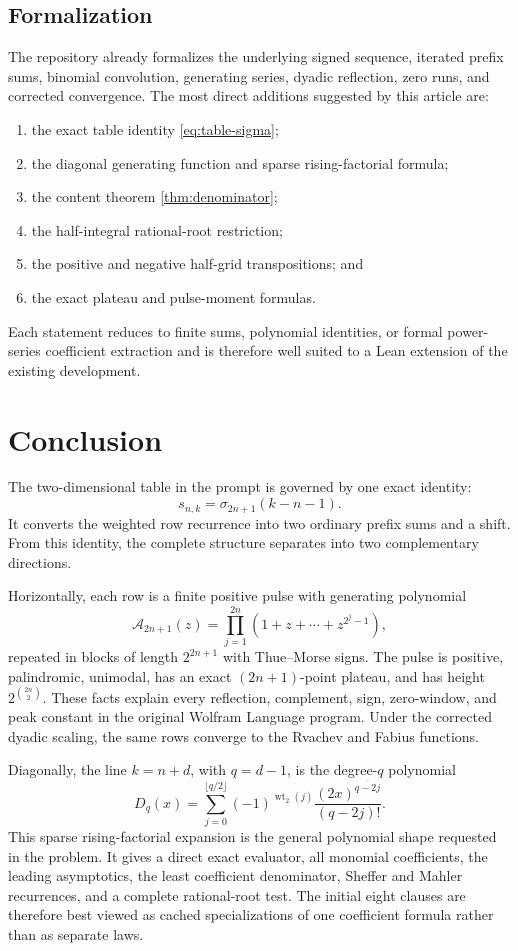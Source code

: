\documentclass[11pt]{article}
\theoremstyle{definition}
\theoremstyle{remark}
\newcommand{\A}{\mathcal A}
\newcommand{\Diag}{D}
\newcommand{\rising}[2]{#1^{\overline{#2}}}
\newcommand{\wt}{\operatorname{wt}_2}
\begin{document}
\subsection{Formalization}

The repository already formalizes the underlying signed sequence, iterated
prefix sums, binomial convolution, generating series, dyadic reflection,
zero runs, and corrected convergence.  The most direct additions suggested
by this article are:
\begin{enumerate}[leftmargin=2.2em]
\item the exact table identity \cref{eq:table-sigma};
\item the diagonal generating function and sparse rising-factorial formula;
\item the content theorem \cref{thm:denominator};
\item the half-integral rational-root restriction;
\item the positive and negative half-grid transpositions; and
\item the exact plateau and pulse-moment formulas.
\end{enumerate}
Each statement reduces to finite sums, polynomial identities, or formal
power-series coefficient extraction and is therefore well suited to a Lean
extension of the existing development.

\section{Conclusion}

The two-dimensional table in the prompt is governed by one exact identity:
\[
 s_{n,k}=\sigma_{2n+1}(k-n-1).
\]
It converts the weighted row recurrence into two ordinary prefix sums and a
shift.  From this identity, the complete structure separates into two
complementary directions.

Horizontally, each row is a finite positive pulse with generating polynomial
\[
 \A_{2n+1}(z)=
 \prod_{j=1}^{2n}(1+z+\cdots+z^{2^j-1}),
\]
repeated in blocks of length \(2^{2n+1}\) with Thue--Morse signs.  The pulse
is positive, palindromic, unimodal, has an exact \((2n+1)\)-point plateau,
and has height \(2^{\binom{2n}{2}}\).  These facts explain every reflection,
complement, sign, zero-window, and peak constant in the original Wolfram
Language program.  Under the corrected dyadic scaling, the same rows
converge to the Rvachev and Fabius functions.

Diagonally, the line \(k=n+d\), with \(q=d-1\), is the degree-\(q\)
polynomial
\[
 \boxed{
 \Diag_q(x)=\sum_{j=0}^{\lfloor q/2\rfloor}
 (-1)^{\wt(j)}\frac{\rising{(2x)}{q-2j}}{(q-2j)!}.}
\]
This sparse rising-factorial expansion is the general polynomial shape
requested in the problem.  It gives a direct exact evaluator, all monomial
coefficients, the leading asymptotics, the least coefficient denominator,
Sheffer and Mahler recurrences, and a complete rational-root test.  The
initial eight clauses are therefore best viewed as cached specializations
of one coefficient formula rather than as separate laws.
\end{document}
